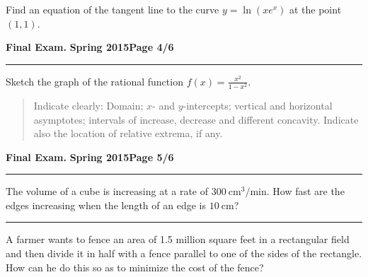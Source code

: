 \documentclass[12pt]{article}
\theoremstyle{definition}
\begin{document}
{{{\problem[10 pts] Find an equation of the tangent line to the curve
$y=\ln( x e^x)$ at the point $(1,1)$.}
\vspace{8cm}
\begin{flushright}
\end{flushright}

\newpage

\hfill{\large\bf Final Exam.}\hfill{\large\bf
  Spring 2015}\hfill{\large\bf Page 4/6}\hrule

\bigskip
{\problem[20 pts] Sketch the graph of the rational function $f(x)
  = \displaystyle{\frac{x^2}{1-x^2}}$.}
\begin{quotation}
{\small \noindent
Indicate clearly: Domain; $x$- and $y$-intercepts; vertical and horizontal asymptotes; intervals of increase, decrease and different concavity. Indicate also the location of relative extrema, if any.}
\end{quotation}

\newpage

\hfill{\large\bf Final Exam.}\hfill{\large\bf
  Spring 2015}\hfill{\large\bf Page 5/6}\hrule
  
\bigskip

{\problem[10 pts] The volume of a cube is increasing at a rate of
  $300~\text{cm}^3/\text{min}$.  How fast are the edges increasing
  when the length of an edge is $10~\text{cm}$?}
\vspace{8cm}
\begin{flushright}
\end{flushright}
\hrule
{\problem[10 pts] A farmer wants to fence an area of 1.5 million square feet in a rectangular field and then divide it in half with a fence parallel to one of the sides of the rectangle.  How can he do this so as to minimize the cost of the fence?}
\vspace{8cm}
\begin{flushright}
\end{flushright}
\newpage

}}
\end{document}
